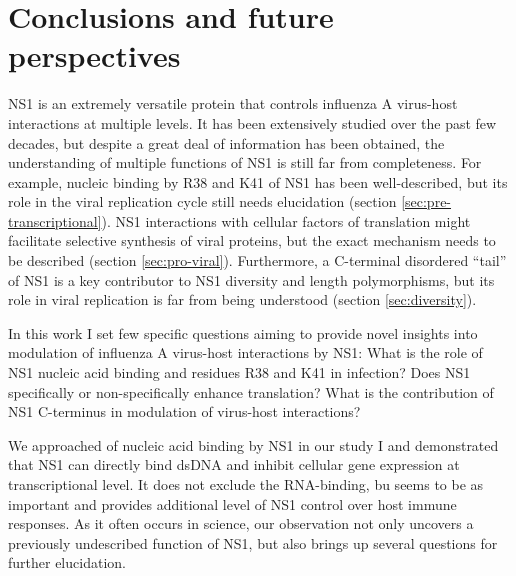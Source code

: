 \newpage
\section{Conclusions and future perspectives}

		NS1 is an extremely versatile protein that controls influenza A virus-host interactions at multiple levels. It has been extensively studied over the past few decades, but despite a great deal of information has been obtained, the understanding of multiple functions of NS1 is still far from  completeness. For example, nucleic binding by R38 and K41 of NS1 has been well-described, but its role in the viral replication cycle still needs elucidation (section \ref{sec:pre-transcriptional}). NS1 interactions with cellular factors of translation might facilitate selective synthesis of viral proteins, but the exact mechanism needs to be described (section \ref{sec:pro-viral}). Furthermore, a C-terminal disordered ``tail'' of NS1 is a key contributor to NS1 diversity and length polymorphisms, but its role in viral replication is far from being understood (section \ref{sec:diversity}).
		
		In this work I set few specific questions aiming to provide novel insights into modulation of influenza A virus-host interactions by NS1: What is the role of NS1 nucleic acid binding and residues R38 and K41 in infection? Does NS1 specifically or non-specifically enhance translation? What is the contribution of NS1 C-terminus in modulation of virus-host interactions? 
		
		We approached of nucleic acid binding by NS1 in our study I and demonstrated that NS1 can directly bind dsDNA and inhibit cellular gene expression at transcriptional level. It does not exclude the RNA-binding, bu seems to be as important and provides additional level of NS1 control over host immune responses. As it often occurs in science, our observation not only uncovers a previously undescribed function of NS1, but also brings up several questions for further elucidation. 
		
